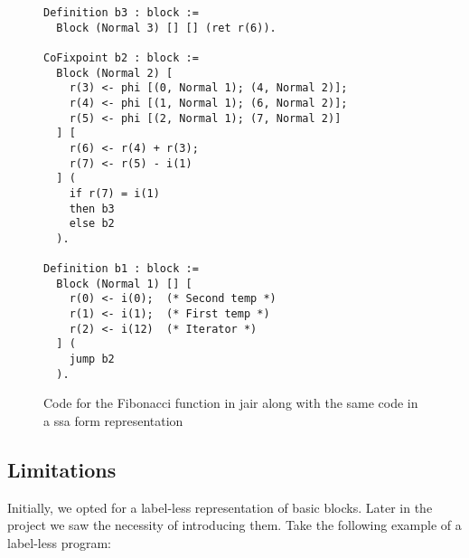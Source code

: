 \begin{figure}[ht]
\centering
\begin{minipage}{0.65\textwidth}
\begin{lstlisting}[style=Rocq]
Definition b3 : block :=
  Block (Normal 3) [] [] (ret r(6)).

CoFixpoint b2 : block :=
  Block (Normal 2) [
    r(3) <- phi [(0, Normal 1); (4, Normal 2)];
    r(4) <- phi [(1, Normal 1); (6, Normal 2)];
    r(5) <- phi [(2, Normal 1); (7, Normal 2)]
  ] [
    r(6) <- r(4) + r(3);
    r(7) <- r(5) - i(1)
  ] (
    if r(7) = i(1)
    then b3
    else b2
  ).

Definition b1 : block :=
  Block (Normal 1) [] [
    r(0) <- i(0);  (* Second temp *)
    r(1) <- i(1);  (* First temp *)
    r(2) <- i(12)  (* Iterator *)
  ] (
    jump b2
  ).
\end{lstlisting}
\end{minipage}
\hfill
\begin{minipage}{0.30\textwidth}
\centering
{}
\end{minipage}
\caption{Code for the Fibonacci function in \gls{jair} along with the same code in a \gls{ssa} form representation}
\label{fig:example-jair}
\end{figure}

\subsection{Limitations}
\label{subsec:limitations}

Initially, we opted for a label-less representation of basic blocks.
Later in the project we saw the necessity of introducing them. Take the following example of a label-less program:

